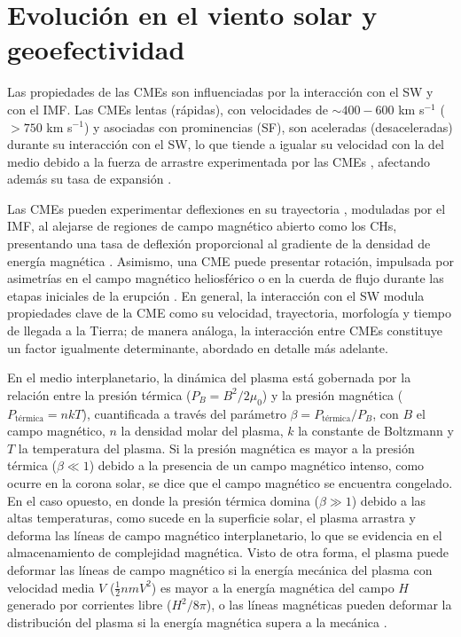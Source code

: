 \section{Evolución en el viento solar y geoefectividad}
\label{comportamiento}
Las propiedades de las \acp{CME} son influenciadas por la interacción con el \ac{SW} y con el \ac{IMF}. Las CMEs lentas (rápidas), con velocidades de $\sim400-600$ km s$^{-1}$ ($>750$ km s$^{-1}$) y asociadas con prominencias (\ac{SF}), son aceleradas (desaceleradas) durante su interacción con el \ac{SW}, lo que tiende a igualar su velocidad con la del medio debido a la fuerza de arrastre experimentada por las CMEs \parencite[e.g.,][]{yashiro-2004, sheeley-1999, mayank-2023, mishra-2017, gopalswamy-2000, cargill-2004}, afectando además su tasa de expansión \parencite[e.g.,][]{poomvises-2010}. 

Las \acp{CME} pueden experimentar deflexiones en su trayectoria \parencite[e.g.,][]{kay-2016}, moduladas por el \ac{IMF}, al alejarse de regiones de campo magnético abierto como los \acp{CH}, presentando una tasa de deflexión proporcional al gradiente de la densidad de energía magnética \parencite[e.g.,][]{gopalswamy-2009, gui-2011}. Asimismo, una CME puede presentar rotación, impulsada por asimetrías en el campo magnético heliosférico \parencite[e.g.,][]{yurchyshyn-2009} o en la cuerda de flujo  durante las etapas iniciales de la erupción \parencite[e.g.,][]{vourlidas-2011}. En general, la interacción con el \ac{SW} modula propiedades clave de la \ac{CME} como su velocidad, trayectoria, morfología y tiempo de llegada a la Tierra; de manera análoga, la interacción entre \acp{CME} constituye un factor igualmente determinante, abordado en detalle más adelante.

En el medio interplanetario, la dinámica del plasma está gobernada por la relación entre la presión térmica ($P_B = B^2/2\mu_0$) y la presión magnética ($P_{\text{térmica}}=nkT$), cuantificada a través del parámetro $\beta = P_{\text{térmica}}/P_B$, con $B$ el campo magnético, $n$ la densidad molar del plasma, $k$ la constante de Boltzmann y $T$ la temperatura del plasma. Si la presión magnética es mayor a la presión térmica ($\beta \ll 1$) debido a la presencia de un campo magnético intenso, como ocurre en la corona solar, se dice que el campo magnético se encuentra congelado. En el caso opuesto, en donde la presión térmica domina ($\beta \gg 1$) debido a las altas temperaturas, como sucede en la superficie solar, el plasma arrastra y deforma las líneas de campo magnético interplanetario, lo que se evidencia en el almacenamiento de complejidad magnética. Visto de otra forma, el plasma puede deformar las líneas de campo magnético si la energía mecánica del plasma con velocidad media $V$ ($\frac{1}{2}nmV^{2}$) es mayor a la energía magnética del campo $H$ generado por corrientes libre ($H^{2}/8\pi$), o las líneas magnéticas pueden deformar la distribución del plasma si la energía magnética supera a la mecánica \parencite[e.g.,][]{billings-1966}.

